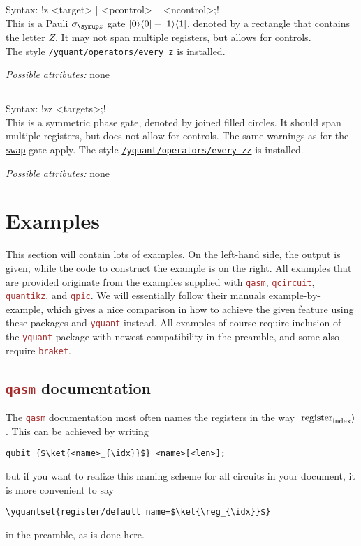\documentclass{scrartcl}
\makeatletter
\def\pkg#1{\textcolor{brown}{\texttt{#1}}}
\def\gate#1{\hyperref[gate:#1]{\texttt{#1}}}
\def\style#1{\hyperref[style:#1]{\texttt{#1}}}
\def\Yquant{\pkg{yquant}}
\def\ketbra#1#2{\ket{#1}\!\bra{#2}}
\newcommand*{\the@orig@section}{}
\let\the@orig@section=\section
\renewcommand*{\section}{%
   \clearpage%
   \the@orig@section%
}
\makeatother
\begin{document}
      \subsection{\texorpdfstring{}{z}}\label{gate:z}
         Syntax: \yquant!z <target> | <pcontrol> ~ <ncontrol>;! \\
         This is a Pauli $\sigma_{\symup z}$ gate $\ketbra00 - \ketbra11$, denoted by a rectangle that contains the letter $Z$.
         It may not span multiple registers, but allows for controls. \\
         The style \style{/yquant/operators/every z} is installed.

         \emph{Possible attributes:} none

      \subsection{\texorpdfstring{}{zz}}\label{gate:zz}
         Syntax: \yquant!zz <targets>;! \\
         This is a symmetric phase gate, denoted by joined filled circles.
         It should span multiple registers, but does not allow for controls.
         The same warnings as for the \gate{swap} gate apply.
         The style \style{/yquant/operators/every zz} is installed.

         \emph{Possible attributes:} none


   \section{Examples}\label{sec:examples}
      This section will contain lots of examples.
      On the left\hyp hand side, the output is given, while the code to construct the example is on the right.
      All examples that are provided originate from the examples supplied with \pkg{qasm}, \pkg{qcircuit}, \pkg{quantikz}, and \pkg{qpic}.
      We will essentially follow their manuals example\hyp by\hyp example, which gives a nice comparison in how to achieve the given feature using these packages and \Yquant{} instead.
      All examples of course require inclusion of the \Yquant{} package with newest compatibility in the preamble, and some also require \pkg{braket}.

      \subsection{\pkg{qasm} documentation}
      \begingroup%
         The \pkg{qasm} documentation most often names the registers in the way $\ket{\mathrm{register}_{\mathrm{index}}}$.
         This can be achieved by writing
         \begin{verbatim}
qubit {$\ket{<name>_{\idx}}$} <name>[<len>];
         \end{verbatim}
         but if you want to realize this naming scheme for all circuits in your document, it is more convenient to say
         \begin{verbatim}
\yquantset{register/default name=$\ket{\reg_{\idx}}$}
         \end{verbatim}
         in the preamble, as is done here.
\end{document}
